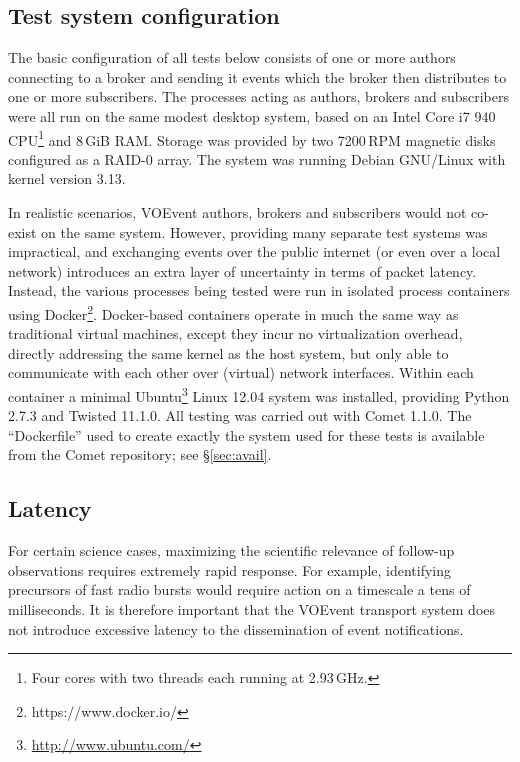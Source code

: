 \documentclass[5p,authoryear]{elsarticle}
\begin{document}
\subsection{Test system configuration}
\label{sec:perf:system}

The basic configuration of all tests below consists of one or more authors
connecting to a broker and sending it events which the broker then distributes
to one or more subscribers. The processes acting as authors, brokers and
subscribers were all run on the same modest desktop system, based on an Intel
Core i7 940 CPU\footnote{Four cores with two threads each running at
2.93\,GHz.}
and 8\,GiB RAM. Storage was provided by two 7200\,RPM magnetic disks
configured as a RAID-0 array. The system was running Debian GNU/Linux with kernel
version 3.13.

In realistic scenarios, VOEvent authors, brokers and subscribers would not
co-exist on the same system. However, providing many separate test systems was
impractical, and exchanging events over the public internet (or even over a
local network) introduces an extra layer of uncertainty in terms of packet
latency. Instead, the various processes being tested were run in isolated
process containers using Docker\footnote{https://www.docker.io/}. Docker-based
containers operate in much the same way as traditional virtual machines,
except they incur no virtualization overhead, directly addressing the same
kernel as the host system, but only able to communicate with each other over
(virtual) network interfaces. Within each container a minimal
Ubuntu\footnote{\url{http://www.ubuntu.com/}} Linux 12.04 system was
installed, providing Python 2.7.3 and Twisted 11.1.0. All testing was carried
out with Comet 1.1.0. The ``Dockerfile'' used to create exactly the
system used for these tests is available from the Comet repository; see
\S\ref{sec:avail}.

\subsection{Latency}
\label{sec:perf:latency}

For certain science cases, maximizing the scientific relevance of follow-up
observations requires extremely rapid response. For example, identifying
precursors of fast radio bursts \citep{Thornton:2013} would require action on
a timescale a tens of milliseconds. It is therefore important that the VOEvent
transport system does not introduce excessive latency to the dissemination of
event notifications.
\end{document}
